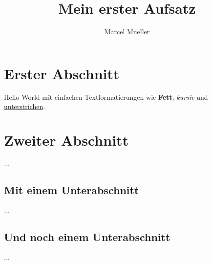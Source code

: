 \documentclass[12pt,a4paper,final]{article}
\author{Marcel Mueller}
\title{Mein erster Aufsatz}
\begin{document}
	\maketitle
	\tableofcontents
	\section{Erster Abschnitt}
	Hello World mit einfachen Textformatierungen wie \textbf{Fett}, \textit{kursiv} und \underline{unterstrichen}. 
	\section{Zweiter Abschnitt}
	...
	\subsection{Mit einem Unterabschnitt}
	 ...
	\subsection{Und noch einem Unterabschnitt}
	...
\end{document}
